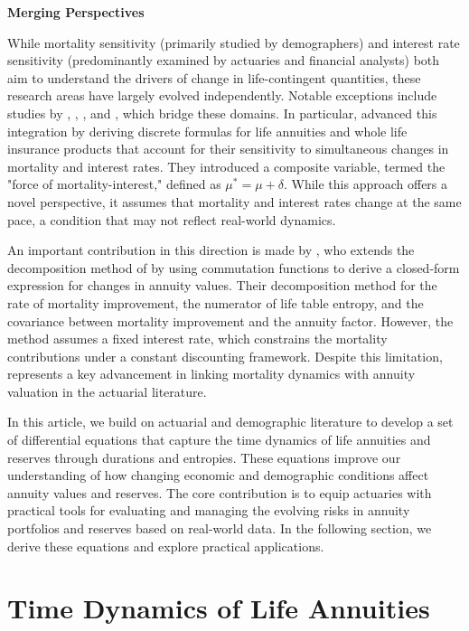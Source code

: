 \documentclass[12pt]{article}
\begin{document}
\textbf{Merging Perspectives}

While mortality sensitivity (primarily studied by demographers) and interest rate sensitivity (predominantly examined by actuaries and financial analysts) both aim to understand the drivers of change in life-contingent quantities, these research areas have largely evolved independently. Notable exceptions include studies by \citet{Haberman2011}, \citet{rabitti2020mortality}, \citet{Lin2020}, \citet{alvarez2021linking} and \citet{di2025decomposing}, which bridge these domains. In particular, \citet{Lin2020} advanced this integration by deriving discrete formulas for life annuities and whole life insurance products that account for their sensitivity to simultaneous changes in mortality and interest rates. They introduced a composite variable, termed the "force of mortality-interest," defined as $\mu^* = \mu + \delta$. While this approach offers a novel perspective, it assumes that mortality and interest rates change at the same pace, a condition that may not reflect real-world dynamics. 


An important contribution in this direction is made by \citet{di2025decomposing}, who extends the decomposition method of \citet{Vaupel2003} by using commutation functions to derive a closed-form expression for changes in annuity values. Their decomposition method for the rate of mortality improvement, the numerator of life table entropy, and the covariance between mortality improvement and the annuity factor. However, the method assumes a fixed interest rate, which constrains the mortality contributions under a constant discounting framework. Despite this limitation, \citet{di2025decomposing} represents a key advancement in linking mortality dynamics with annuity valuation in the actuarial literature.

In this article, we build on actuarial and demographic literature to develop a set of differential equations that capture the time dynamics of life annuities and reserves through durations and entropies. These equations improve our understanding of how changing economic and demographic conditions affect annuity values and reserves. The core contribution is to equip actuaries with practical tools for evaluating and managing the evolving risks in annuity portfolios and reserves based on real-world data. In the following section, we derive these equations and explore practical applications. 


\section{Time Dynamics of Life Annuities}\label{sec:TimeDynamics}
\end{document}

